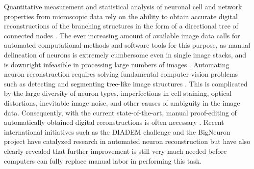 %

Quantitative measurement and statistical analysis of neuronal cell and network properties from microscopic data rely on the ability to obtain accurate digital reconstructions of the branching structures \citep{halavi2012digital} in the form of a directional tree of connected nodes \citep{ascoli2007neuromorpho}. The ever increasing amount of available image data calls for automated computational methods and software tools for this purpose, as manual delineation of neurons is extremely cumbersome even in single image stacks, and is downright infeasible in processing large numbers of images \citep{svoboda2011past, senft2011brief}. Automating neuron reconstruction requires solving fundamental computer vision problems such as detecting and segmenting tree-like image structures \citep{meijering2010neuron, donohue2011automated, acciai2016automated}. This is complicated by the large diversity of neuron types, imperfections in cell staining, optical distortions, inevitable image noise, and other causes of ambiguity in the image data. Consequently, with the current state-of-the-art, manual proof-editing of automatically obtained digital reconstructions is often necessary \citep{peng2011proof}. Recent international initiatives such as the DIADEM challenge \citep{gillette2011diademchallenge} and the BigNeuron project \citep{peng2015bigneuron, peng2015diadem2bigneuron} have catalyzed research in automated neuron reconstruction but have also clearly revealed that further improvement is still very much needed before computers can fully replace manual labor in performing this task.

